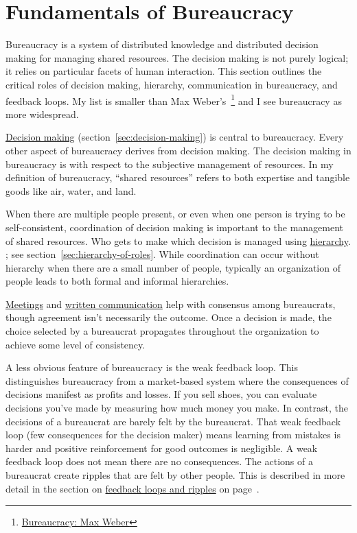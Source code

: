 \section{Fundamentals of Bureaucracy\label{sec:fundamentals-of-b}}
  
Bureaucracy is a system of distributed knowledge and distributed decision making for managing shared resources. The decision making is not purely logical; it relies on particular facets of human interaction. This section outlines the critical roles of decision making, hierarchy, communication in bureaucracy, and feedback loops. 
My list is smaller than Max Weber's~\cite{2015_Weber}\footnote{\href{https://en.wikipedia.org/wiki/Bureaucracy\#Max_Weber}{Bureaucracy: Max Weber}
} and I see bureaucracy as more widespread.

\hyperref[sec:decision-making]{Decision making}
\ifsectionref
(section~\ref{sec:decision-making}) 
\fi
is central to bureaucracy. Every other aspect of bureaucracy derives from decision making. The decision making in bureaucracy is with respect to the subjective management of resources. In my definition of bureaucracy, ``\glspl{shared resource}'' refers to both expertise and tangible goods like air, water, and land. 

When there are multiple people present, or even when one person is trying to be self-consistent, coordination of decision making is important to the management of shared resources. Who gets to make which decision is managed using
\hyperref[sec:hierarchy-of-roles]{hierarchy}.
\ifsectionref
; see section~\ref{sec:hierarchy-of-roles}.
\fi
While coordination can occur without hierarchy when there are a small number of people, typically an organization of people leads to both formal and informal hierarchies. 

\hyperref[sec:meetings-for-coordination]{Meetings} and \hyperref[sec:written-communication]{written communication} help with consensus among bureaucrats, though agreement isn't necessarily the outcome.
Once a decision is made, the choice selected by a bureaucrat propagates throughout the organization to achieve some level of consistency. 

A less obvious feature of bureaucracy is the weak \gls{feedback loop}. This distinguishes bureaucracy from a market-based system where the consequences of decisions manifest as profits and losses. If you sell shoes, you can evaluate decisions you've made by measuring how much money you make. In contrast, the decisions of a bureaucrat are barely felt by the bureaucrat. That weak feedback loop (few consequences for the decision maker) means learning from mistakes is harder and positive reinforcement for good outcomes is negligible. A weak feedback loop does not mean there are no consequences. The actions of a bureaucrat create ripples that are felt by other people. This is described in more detail in the section on \hyperref[sec:feedback-loop-and-ripples]{feedback loops and ripples} on page~\pageref{sec:feedback-loop-and-ripples}.

